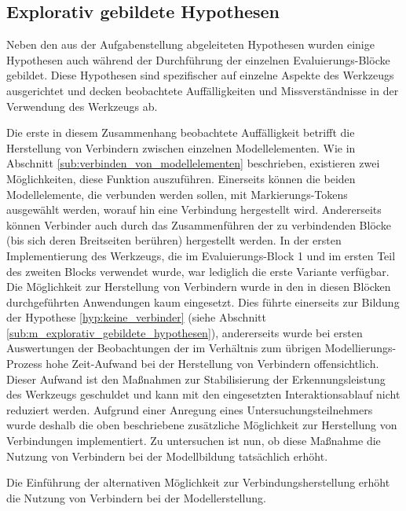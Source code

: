 
\subsection{Explorativ gebildete Hypothesen} %
\label{sub:explorativ_gebildete_hypothesen}

Neben den aus der Aufgabenstellung abgeleiteten Hypothesen wurden einige Hypothesen auch während der Durchführung der einzelnen Evaluierungs-Blöcke gebildet. Diese Hypothesen sind spezifischer auf einzelne Aspekte des Werkzeugs ausgerichtet und decken beobachtete Auffälligkeiten und Missverständnisse in der Verwendung des Werkzeugs ab. 

Die erste in diesem Zusammenhang beobachtete Auffälligkeit betrifft die Herstellung von Verbindern zwischen einzelnen Modellelementen. Wie in Abschnitt \ref{sub:verbinden_von_modellelementen} beschrieben, existieren zwei Möglichkeiten, diese Funktion auszuführen. Einerseits können die beiden Modellelemente, die verbunden werden sollen, mit Markierungs-Tokens ausgewählt werden, worauf hin eine Verbindung hergestellt wird. Andererseits können Verbinder auch durch das Zusammenführen der zu verbindenden Blöcke (bis sich deren Breitseiten berühren) hergestellt werden. In der ersten Implementierung des Werkzeugs, die im Evaluierungs-Block 1 und im ersten Teil des zweiten Blocks verwendet wurde, war lediglich die erste Variante verfügbar. Die Möglichkeit zur Herstellung von Verbindern wurde in den in diesen Blöcken durchgeführten Anwendungen kaum eingesetzt. Dies führte einerseits zur Bildung der Hypothese \ref{hyp:keine_verbinder} (siehe Abschnitt \ref{sub:m_explorativ_gebildete_hypothesen}), andererseits wurde bei ersten Auswertungen der Beobachtungen der im Verhältnis zum übrigen Modellierungs-Prozess hohe Zeit-Aufwand bei der Herstellung von Verbindern offensichtlich. Dieser Aufwand ist den Maßnahmen zur Stabilisierung der Erkennungsleistung des Werkzeugs geschuldet und kann mit den eingesetzten Interaktionsablauf nicht reduziert werden. Aufgrund einer Anregung eines Untersuchungsteilnehmers wurde deshalb die oben beschriebene zusätzliche Möglichkeit zur Herstellung von Verbindungen implementiert. Zu untersuchen ist nun, ob diese Maßnahme die Nutzung von Verbindern bei der Modellbildung tatsächlich erhöht.

\begin{hyp}
	\label{hyp:verbinder}
	Die Einführung der alternativen Möglichkeit zur Verbindungsherstellung erhöht die Nutzung von Verbindern bei der Modellerstellung.
\end{hyp}


